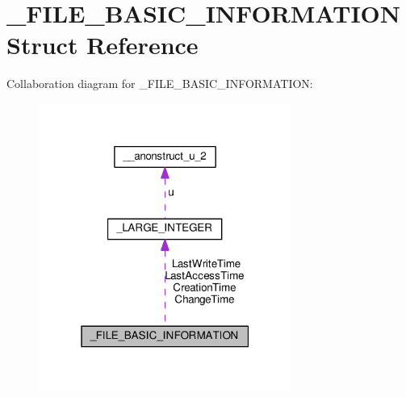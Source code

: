 \hypertarget{struct__FILE__BASIC__INFORMATION}{}\section{\+\_\+\+F\+I\+L\+E\+\_\+\+B\+A\+S\+I\+C\+\_\+\+I\+N\+F\+O\+R\+M\+A\+T\+I\+O\+N Struct Reference}
\label{struct__FILE__BASIC__INFORMATION}


Collaboration diagram for \+\_\+\+F\+I\+L\+E\+\_\+\+B\+A\+S\+I\+C\+\_\+\+I\+N\+F\+O\+R\+M\+A\+T\+I\+O\+N\+:
\nopagebreak
\begin{figure}[H]
\begin{center}
\leavevmode
\includegraphics[width=235pt]{struct__FILE__BASIC__INFORMATION__coll__graph}
\end{center}
\end{figure}
